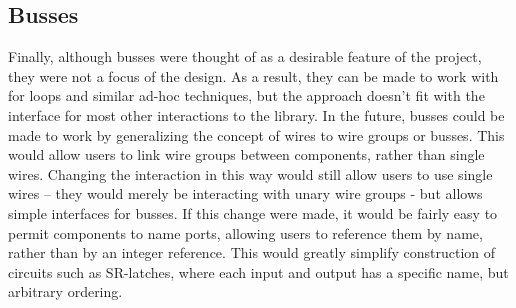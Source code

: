 \documentclass{article}
\begin{document}
\subsection{Busses}
Finally, although busses were thought of as a desirable feature of the project, they were not a focus of the design. As a result, they can be made to work with for loops and similar ad-hoc techniques, but the approach doesn’t fit with the interface for most other interactions to the library. In the future, busses could be made to work by generalizing the concept of wires to wire groups or busses. This would allow users to link wire groups between components, rather than single wires. Changing the interaction in this way would still allow users to use single wires -- they would merely be interacting with unary wire groups - but allows simple interfaces for busses. If this change were made, it would be fairly easy to permit components to name ports, allowing users to reference them by name, rather than by an integer reference. This would greatly simplify construction of circuits such as SR-latches, where each input and output has a specific name, but arbitrary ordering.



\end{document}
